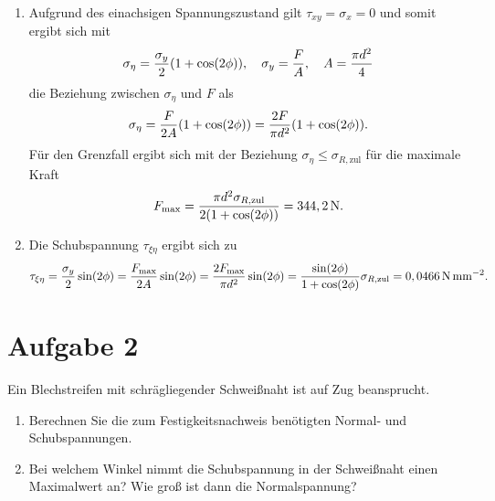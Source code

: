 \documentclass{exercise}
\begin{document}
    \begin{enumerate}
        \item Aufgrund des einachsigen Spannungszustand gilt \(\tau_{xy} = \sigma_x = 0\) und somit ergibt sich mit
        \[
            \sigma_\eta = \frac{\sigma_y}{2}\parentheses*{1 + \cos\parentheses*{2\phi}}, \quad \sigma_y = \frac{F}{A}, \quad A = \frac{\pi d^2}{4}
        \]
        die Beziehung zwischen \(\sigma_\eta\) und \(F\) als
        \[
            \sigma_\eta = \frac{F}{2A}\parentheses*{1 + \cos\parentheses*{2\phi}} = \frac{2F}{\pi d^2}\parentheses*{1 + \cos\parentheses*{2\phi}}.
        \]
        Für den Grenzfall ergibt sich mit der Beziehung \(\sigma_\eta \le \sigma_{R, \text{zul}}\) für die maximale Kraft
        \[
            F_{\text{max}} = \frac{\pi d^2\sigma_{R, \text{zul}}}{2\parentheses*{1 + \cos\parentheses*{2\phi}}} = 344,2\sis{\newton}.
        \]
        \item Die Schubspannung \(\tau_{\xi\eta}\) ergibt sich zu
        \[
            \tau_{\xi\eta} = \frac{\sigma_y}{2}\sin\parentheses*{2\phi} = \frac{F_{\text{max}}}{2A}\sin\parentheses*{2\phi} = \frac{2F_{\text{max}}}{\pi d^2}\sin\parentheses*{2\phi} = \frac{\sin\parentheses*{2\phi}}{1 + \cos\parentheses*{2\phi}}\sigma_{R, \text{zul}} = 0,0466\sis{\newton\per\milli\meter\squared}.
        \]
    \end{enumerate}

    
    \section*{Aufgabe 2}

    \begin{problem}
        Ein Blechstreifen mit schrägliegender Schweißnaht ist auf Zug beansprucht.
        \begin{enumerate}
            \item Berechnen Sie die zum Festigkeitsnachweis benötigten Normal- und Schubspannungen.
            \item Bei welchem Winkel nimmt die Schubspannung in der Schweißnaht einen Maximalwert an?
            Wie groß ist dann die Normalspannung?
        \end{enumerate}
    \end{problem}
\end{document}
